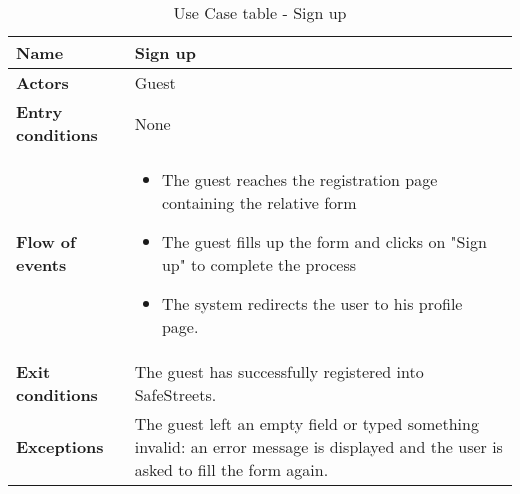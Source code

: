 \begin{table}[!htbp]
\centering
\begin{tabular}{lp{8cm}}
\bf\large Name&\bf\large Sign up\\
\hline
\hline
\bf Actors&Guest\\
\hline
\bf Entry conditions&None\\
\hline
\bf Flow of events&
\begin{itemize}
\item The guest reaches the registration page containing the relative form
\item The guest fills up the form and clicks on "Sign up" to complete the process
\item The system redirects the user to his profile page.
\end{itemize}
\\
\hline
\bf Exit conditions&The guest has successfully registered into SafeStreets. \\
\hline
\bf Exceptions&The guest left an empty field or typed
 something invalid: an error message is displayed 
 and the user is asked to fill the form again.\\
\hline

\end{tabular}
\caption{Use Case table - Sign up} \label{tab:signup}
\end{table}
